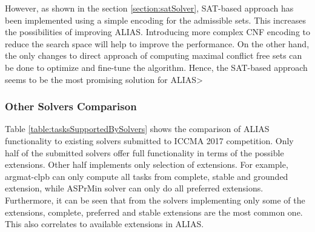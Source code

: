 However, as shown in the section \ref{section:satSolver}, SAT-based approach has been implemented using a simple encoding for the admissible sets. This increases the possibilities of improving ALIAS. Introducing more complex CNF encoding to reduce the search space will help to improve the performance. On the other hand, the only changes to direct approach of computing maximal conflict free sets can be done to optimize and fine-tune the algorithm. Hence, the SAT-based approach seems to be the most promising solution for ALIAS>

\subsubsection{Other Solvers Comparison}
Table \ref{table:tasksSupportedBySolvers} shows the comparison of ALIAS functionality to existing solvers submitted to ICCMA 2017 competition. Only half of the submitted solvers offer full functionality in terms of the possible extensions. Other half implements only selection of extensions. For example, argmat-clpb can only compute all tasks from complete, stable and grounded extension, while ASPrMin solver can only do all preferred extensions. Furthermore, it can be seen that from the solvers implementing only some of the extensions, complete, preferred and stable extensions are the most common one. This also correlates to available extensions in ALIAS.

